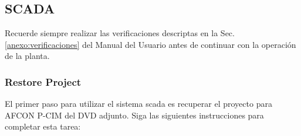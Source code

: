 \newpage
\subsection{SCADA}
\label{anexo:operacionSCADA}

\begin{lattention}
 Recuerde siempre realizar las verificaciones descriptas en la Sec.
\ref{anexo:verificaciones} del Manual del Usuario antes de continuar con la
operación de la planta.
\end{lattention}

\subsubsection{Restore Project}
El primer paso para utilizar el sistema \gls{scada} es recuperar el 
proyecto para AFCON P-CIM del DVD adjunto. Siga las siguientes instrucciones 
para completar esta tarea:
